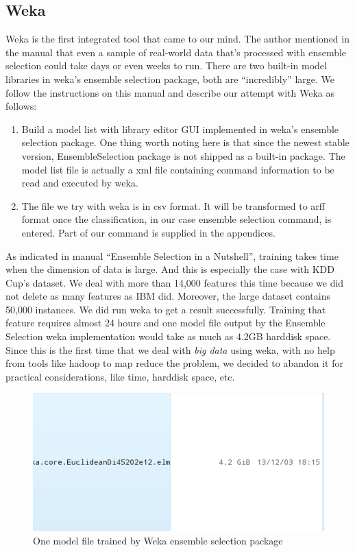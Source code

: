 \documentclass[journal]{IEEEtran}
\begin{document}
\subsection{Weka}
\label{sec:weka}

Weka is the first integrated tool that came to our mind. The author
mentioned in the manual that even a sample of real-world data that's
processed with ensemble selection could take days or even weeks to
run\cite{ref:ensembleselectionnutshell}. There are two built-in model
libraries in weka's ensemble selection package, both are
``incredibly'' large. We follow the instructions on this manual and
describe our attempt with Weka as follows:
\begin{enumerate}
\item Build a model list with library editor GUI implemented in weka's
  ensemble selection package. One thing worth noting here is that
  since the newest stable version, EnsembleSelection package is not
  shipped as a built-in package. The model list file is actually a xml
  file containing command information to be read and executed by
  weka. 
\item The file we try with weka is in csv format. It will be
  transformed to arff format once the classification, in our case
  ensemble selection command, is entered. Part of our command is
  supplied in the appendices.
\end{enumerate}
As indicated in manual ``Ensemble Selection in a Nutshell'', training
takes time when the dimension of data is large. And this is especially
the case with KDD Cup's dataset. We deal with more than 14,000
features this time because we did not delete as many features as IBM
did. Moreover, the large dataset contains 50,000 instances. We did run
weka to get a result successfully. Training that feature requires
almost 24 hours and one model file output by the Ensemble Selection
weka implementation would take as much as 4.2GB harddisk space. Since
this is the first time that we deal with \emph{big data} using weka,
with no help from tools like hadoop to map reduce the problem, we
decided to abandon it for practical considerations, like time,
harddisk space, etc. 
\begin{figure}[!t]
  \centering
  \includegraphics[scale=0.5]{Age-of-Big-Data9}
  \caption{One model file trained by Weka ensemble selection package}
  \label{fig:weka-1}
\end{figure}
\end{document}
